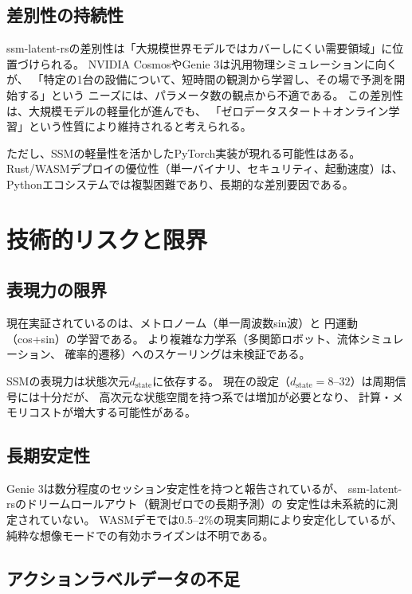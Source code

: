 \documentclass[11pt,a4paper]{ltjsarticle}
\begin{document}
\subsection{差別性の持続性}

ssm-latent-rsの差別性は「大規模世界モデルではカバーしにくい需要領域」に位置づけられる。
NVIDIA CosmosやGenie 3は汎用物理シミュレーションに向くが、
「特定の1台の設備について、短時間の観測から学習し、その場で予測を開始する」という
ニーズには、パラメータ数の観点から不適である。
この差別性は、大規模モデルの軽量化が進んでも、
「ゼロデータスタート＋オンライン学習」という性質により維持されると考えられる。

ただし、SSMの軽量性を活かしたPyTorch実装が現れる可能性はある。
Rust/WASMデプロイの優位性（単一バイナリ、セキュリティ、起動速度）は、
Pythonエコシステムでは複製困難であり、長期的な差別要因である。

\section{技術的リスクと限界}

\subsection{表現力の限界}

現在実証されているのは、メトロノーム（単一周波数sin波）と
円運動（cos+sin）の学習である。
より複雑な力学系（多関節ロボット、流体シミュレーション、
確率的遷移）へのスケーリングは未検証である。

SSMの表現力は状態次元$d_{\mathrm{state}}$に依存する。
現在の設定（$d_{\mathrm{state}}=8$--$32$）は周期信号には十分だが、
高次元な状態空間を持つ系では増加が必要となり、
計算・メモリコストが増大する可能性がある。

\subsection{長期安定性}

Genie 3は数分程度のセッション安定性を持つと報告されているが\cite{deepmind2025genie3}、
ssm-latent-rsのドリームロールアウト（観測ゼロでの長期予測）の
安定性は未系統的に測定されていない。
WASMデモでは0.5--2\%の現実同期により安定化しているが、
純粋な想像モードでの有効ホライズンは不明である。

\subsection{アクションラベルデータの不足}
\end{document}
